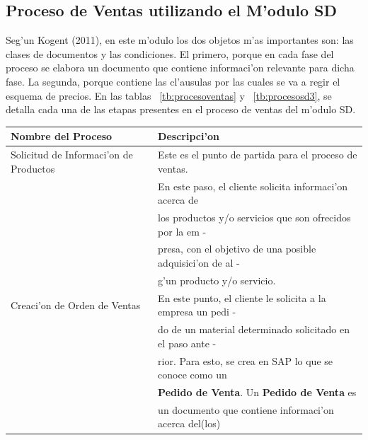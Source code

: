 \subsection{Proceso de Ventas utilizando el M'odulo SD}
\indent Seg'un Kogent (2011), en este m'odulo los dos objetos m'as importantes son: las clases de documentos y las condiciones. El primero, porque en cada fase del proceso se elabora un documento que contiene informaci'on relevante para dicha fase. La segunda, porque contiene las cl'ausulas por las cuales se va a regir el esquema de precios.
\newline
\newline
\indent En las tablas ~\ref{tb:procesoventas} y ~\ref{tb:procesosd3}, se detalla cada una de las etapas presentes en el proceso de ventas del m'odulo SD.

\begin{table}[H]
\footnotesize
\begin{tabular}{|l|l|}
\hline
\textbf{Nombre del Proceso}  & \textbf{Descripci'on}  \\
\hline
Solicitud de Informaci'on de Productos & Este es el punto de partida para el proceso de ventas. \\
                                                            & En este paso, el cliente solicita informaci'on acerca de \\
                                                            & los productos y/o servicios que son ofrecidos por la em - \\
                                                            & presa, con el objetivo de una posible adquisici'on de al - \\
                                                            & g'un producto y/o servicio. \\
\hline
Creaci'on de Orden de Ventas               & En este punto, el cliente le solicita a la empresa un pedi -\\ 
                                                            & do de un material determinado solicitado en el paso ante -\\
                                                            & rior. Para esto, se crea en SAP lo que se conoce como un \\ 
                                                            & \textbf{Pedido de Venta}. Un \textbf{Pedido de Venta} es \\
                                                            & un documento que contiene informaci'on acerca del(los) \\

\end{tabular}
\end{table}
